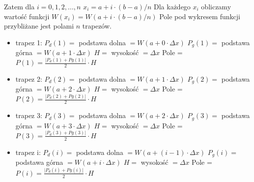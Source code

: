 \documentclass[a4paper,11pt]{article}
\begin{document}
\begin{flushleft}
Zatem dla $i = 0, 1, 2, ..., n$ $x_{i} = a + i \cdot (b - a)/n$
\newline
Dla każdego $x_{i}$ obliczamy wartość funkcji $W\left( x_{i} \right) = W\left( a + i \cdot \left(b-a\right)/n \right)$
\newline
Pole pod wykresem funkcji przybliżane jest polami $n$ trapezów.
\begin{itemize}
\item trapez 1:
\newline
$P_{d}\left(1\right) =$ podstawa dolna $= W\left( a + 0 \cdot \Delta x \right)$
\newline
$P_{g}\left(1\right) =$ podstawa górna $= W\left( a + 1 \cdot \Delta x \right)$
\newline
$H =$ wysokość $= \Delta x$
\newline
Pole = $P\left(1\right) = \frac{\vert P_{d}\left(1\right) + P{g}\left(1\right)\vert}{2} \cdot H$
\item trapez 2:
\newline
$P_{d}\left(2\right) =$ podstawa dolna $= W\left( a + 1 \cdot \Delta x \right)$
\newline
$P_{g}\left(2\right) =$ podstawa górna $= W\left( a + 2 \cdot \Delta x \right)$
\newline
$H =$ wysokość $= \Delta x$
\newline
Pole = $P\left(2\right) = \frac{\vert P_{d}\left(2\right) + P{g}\left(2\right)\vert}{2} \cdot H$
\item trapez 3:
\newline
$P_{d}\left(3\right) =$ podstawa dolna $= W\left( a + 2 \cdot \Delta x \right)$
\newline
$P_{g}\left(3\right) =$ podstawa górna $= W\left( a + 3 \cdot \Delta x \right)$
\newline
$H =$ wysokość $= \Delta x$
\newline
Pole = $P\left(3\right) = \frac{\vert P_{d}\left(3\right) + P{g}\left(3\right)\vert}{2} \cdot H$
\item trapez i:
\newline
$P_{d}\left( i \right) =$ podstawa dolna $= W\left( a + \left( i - 1 \right) \cdot \Delta x \right)$
\newline
$P_{g}\left( i \right) =$ podstawa górna $= W\left( a + i \cdot \Delta x \right)$
\newline
$H =$ wysokość $= \Delta x$
\newline
Pole = $P\left( i \right) = \frac{\vert P_{d}\left( i \right) + P{g}\left( i \right)\vert}{2} \cdot H$

\end{itemize}
\end{flushleft}
\end{document}
